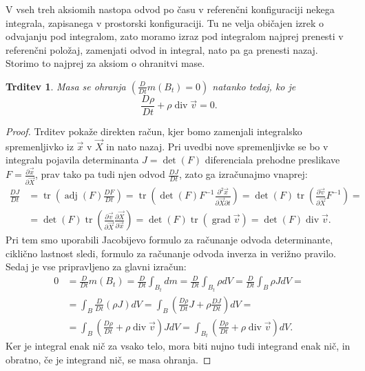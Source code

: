 \documentclass[12pt,a4paper,twoside]{article}
\theoremstyle{definition} %
\theoremstyle{plain} %
\newtheorem{trditev}[definicija]{Trditev}
\numberwithin{equation}{section}
\renewcommand{\div}{\operatorname{div}}
\newcommand{\grad}{\operatorname{grad}}
\newcommand{\dpar}[2]{\ensuremath{\frac{\partial #1}{\partial #2}}}
\newcommand{\DD}[2]{\ensuremath{\frac{D #1}{D #2}}}
\newcommand{\DDt}[1]{\DD{#1}{t}}
\newcommand{\vv}{\vec{v}}
\newcommand{\vX}{\vec{X}}
\newcommand{\vx}{\vec{x}}
\DeclareMathOperator{\tr}{tr}
\begin{document}
V vseh treh aksiomih nastopa odvod po času v referenčni konfiguraciji nekega integrala, zapisanega v
prostorski konfiguraciji. Tu ne velja običajen izrek o odvajanju pod integralom, zato moramo izraz
pod integralom najprej prenesti v referenčni položaj, zamenjati odvod in integral, nato pa ga
prenesti nazaj. Storimo to najprej za aksiom o ohranitvi mase.
\begin{trditev} Masa se ohranja $(\DDt{}m(B_t) = 0)$ natanko tedaj, ko je
  \begin{equation}
    \DDt\rho + \rho\div\vv = 0.
    \label{eq:ohr-masa}
  \end{equation}
\end{trditev}
\begin{proof}
Trditev pokaže direkten račun, kjer bomo zamenjali integralsko spremenljivko iz
$\vx$ v $\vX$ in nato nazaj. Pri uvedbi nove spremenljivke se bo v integralu
pojavila determinanta $J = \det(F)$ diferenciala prehodne preslikave $F =
\dpar{\vx}{\vX}$, prav tako pa tudi njen odvod $\DDt{J}$, zato ga izračunajmo vnaprej:
\begin{align*}
  \DDt J &= \tr\left(\operatorname{adj}(F) \DDt{F}\right) =
  \tr\left(\det(F)F^{-1} \dpar{^2\vx}{\vX\partial t}\right) =
  \det(F)\tr\left(\dpar{\vv}{\vX}F^{-1}\right) = \\ &=
  \det(F)\tr\left(\dpar{\vv}{\vX}\dpar{\vX}{\vx}\right) =
  \det(F)\tr\left(\grad \vv\right) =
  \det(F)\div \vv.
\end{align*}
Pri tem smo uporabili Jacobijevo formulo za računanje odvoda
determinante, ciklično lastnost sledi, formulo za računanje odvoda inverza in verižno pravilo.
Sedaj je vse pripravljeno za glavni izračun:
\begin{align*}
  0 &= \DDt{}m(B_t) =
  \DDt{} \int_{B_t} dm =
  \DDt{} \int_{B_t} \rho dV =
  \DDt{} \int_{B} \rho J dV =\\ &=
  \int_{B} \DDt{}(\rho J) dV =
  \int_{B}\left( \DDt{\rho} J + \rho \DDt{J} \right)dV = \\ &=
  \int_{B}\left( \DDt{\rho}  + \rho \div\vv\right) J dV =
  \int_{B_t}\left( \DDt{\rho}  + \rho \div\vv\right) dV.
\end{align*}
Ker je integral enak nič za vsako telo, mora biti nujno tudi integrand enak nič, in obratno, če
je integrand nič, se masa ohranja.
\end{proof}
\end{document}
